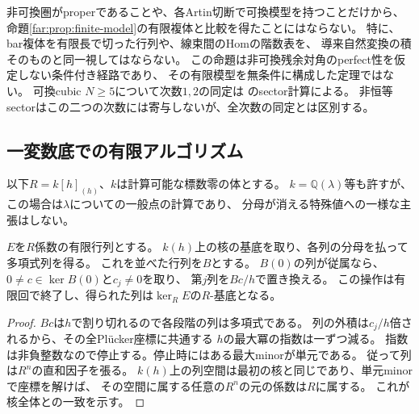 \begin{remark}[未構成の入力]
非可換圏がproperであることや、各Artin切断で可換模型を持つことだけから、
命題\ref{far:prop:finite-model}の有限複体と比較を得たことにはならない。
特に、bar複体を有限長で切った行列や、線束間のHomの階数表を、
導来自然変換の積そのものと同一視してはならない。
この命題は非可換残余対角のperfect性を仮定しない条件付き経路であり、
その有限模型を無条件に構成した定理ではない。
可換cubic $N\ge5$について次数$1,2$の同定は
\cite[Theorem 3.5, Remark 3.6]{FARLinZhang}のsector計算による。
非恒等sectorはこの二つの次数には寄与しないが、全次数の同定とは区別する。
\end{remark}

\subsection{一変数底での有限アルゴリズム}

以下$R=k[h]_{(h)}$、$k$は計算可能な標数零の体とする。
$k=\mathbb Q(\lambda)$等も許すが、この場合は$\lambda$についての一般点の計算であり、
分母が消える特殊値への一様な主張はしない。

\begin{lemma}[核の局所飽和]\label{far:lem:saturation}
$E$を$R$係数の有限行列とする。
$k(h)$上の核の基底を取り、各列の分母を払って多項式列を得る。
これを並べた行列を$B$とする。
$B(0)$の列が従属なら、$0\ne c\in\ker B(0)$と$c_j\ne0$を取り、
第$j$列を$Bc/h$で置き換える。
この操作は有限回で終了し、得られた列は$\ker_R E$の$R$-基底となる。
\end{lemma}
\begin{proof}
$Bc$は$h$で割り切れるので各段階の列は多項式である。
列の外積は$c_j/h$倍されるから、その全Pl\"ucker座標に共通する
$h$の最大冪の指数は一ずつ減る。
指数は非負整数なので停止する。停止時にはある最大minorが単元である。
従って列は$R^n$の直和因子を張る。
$k(h)$上の列空間は最初の核と同じであり、単元minorで座標を解けば、
その空間に属する任意の$R^n$の元の係数は$R$に属する。
これが核全体との一致を示す。
\end{proof}

